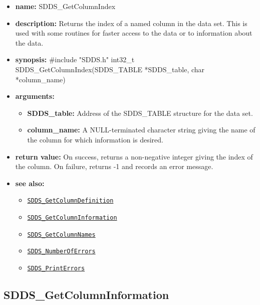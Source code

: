 \documentclass[11pt]{article}
\newcommand{\progref}[1]{\hyperref[SDDS_#1]{\tt SDDS\_#1}}
\begin{document}
\begin{itemize}
\item {\bf name:}\newline
SDDS\_GetColumnIndex
\item {\bf description:}\newline
Returns the index of a named column in the data set. This is used with some routines for faster access to the data or to information about the data.
\item {\bf synopsis:} \#include "SDDS.h"\newline
int32\_t SDDS\_GetColumnIndex(SDDS\_TABLE *SDDS\_table, char *column\_name)
\item {\bf arguments:}
\begin{itemize}
\item {\bf SDDS\_table:} Address of the SDDS\_TABLE structure for the data set.
\item {\bf column\_name:} A NULL-terminated character string giving the name of the column for which information is desired.
\end{itemize}
\item {\bf return value:}\newline
On success, returns a non-negative integer giving the index of the column. On failure, returns -1 and records an error message.
\item {\bf see also:}
\begin{itemize}
\item \progref{GetColumnDefinition}
\item \progref{GetColumnInformation}
\item \progref{GetColumnNames}
\item \progref{NumberOfErrors}
\item \progref{PrintErrors}
\end{itemize}
\end{itemize}

\subsection{SDDS\_GetColumnInformation}
\label{SDDS_GetColumnInformation}
\end{document}
